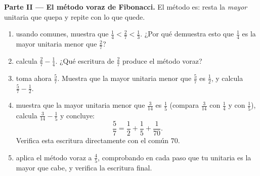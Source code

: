 \begin{problem}
\medskip
\noindent\textbf{Parte II --- El método voraz de Fibonacci.}
El método es: resta la \emph{mayor}  unitaria que
quepa y repite con lo que quede.
\begin{enumerate}[resume]
  \item usando  comunes, muestra que
        $\frac14 < \frac27 < \frac13$. ¿Por qué demuestra esto que
        $\frac14$ es la mayor  unitaria menor que
        $\frac27$?
  \item calcula $\frac27 - \frac14$. ¿Qué escritura de $\frac27$
        produce el método voraz?
  \item toma ahora $\frac57$. Muestra que la mayor  unitaria
        menor que $\frac57$ es $\frac12$, y calcula
        $\frac57 - \frac12$.
  \item muestra que la mayor  unitaria menor que
        $\frac{3}{14}$ es $\frac15$ (compara $\frac{3}{14}$ con
        $\frac14$ y con $\frac15$), calcula
        $\frac{3}{14} - \frac15$ y concluye:
        \[
        \frac57 = \frac12 + \frac15 + \frac{1}{70} .
        \]
        Verifica esta escritura directamente con el  común
        $70$.
  \item aplica el método voraz a $\frac45$, comprobando en cada paso
        que tu  unitaria es la mayor que cabe, y
        verifica la escritura final.
\end{enumerate}


\end{problem}
